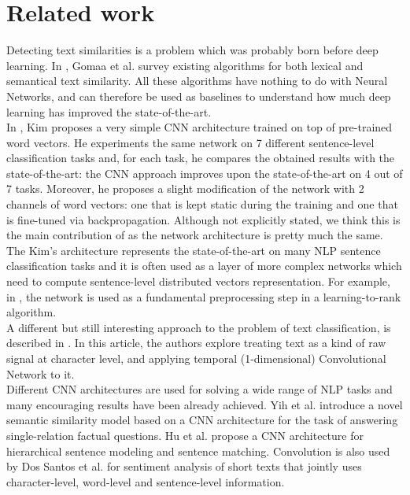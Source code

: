 \documentclass[10pt,twocolumn,letterpaper]{article}
\begin{document}
\section{Related work}
Detecting text similarities is a problem which was probably born before deep learning. In \cite{gomaa2013survey}, Gomaa et al. survey existing algorithms for both lexical and semantical text similarity. All these algorithms have nothing to do with Neural Networks, and can therefore be used as baselines to understand how much deep learning has improved the state-of-the-art.\\
In \cite{kim2014convolutional}, Kim proposes a very simple CNN architecture trained on top of pre-trained word vectors. He experiments the same network on 7 different sentence-level classification tasks and, for each task, he compares the obtained results with the state-of-the-art: the CNN approach improves upon the state-of-the-art on 4 out of 7 tasks. Moreover, he proposes a slight modification of the network with 2 channels of word vectors: one that is kept static during the training and one that is fine-tuned via backpropagation. Although not explicitly stated, we think this is the main contribution of \cite{bogdanova2015detecting} as the network architecture is pretty much the same. The Kim's architecture represents the state-of-the-art on many NLP sentence classification tasks and it is often used as a layer of more complex networks which need to compute sentence-level distributed vectors representation. For example, in \cite{severyn2015learning}, the network is used as a fundamental preprocessing step in a learning-to-rank algorithm. \\
A different but still interesting approach to the problem of text classification, is described in \cite{zhang2015character}. In this article, the authors explore treating text as a kind of raw signal at character level, and applying temporal (1-dimensional) Convolutional Network to it.\\
Different CNN architectures are used for solving a wide range of NLP tasks and many encouraging results have been already achieved. Yih et al. \cite{yih2014semantic} introduce a novel semantic similarity model based on a CNN architecture for the task of answering single-relation factual questions. Hu et al. \cite{hu2014convolutional} propose a CNN architecture for hierarchical sentence modeling and sentence matching. Convolution is also used by Dos Santos et al. \cite{dos2014deep} for sentiment analysis of short texts that jointly uses character-level, word-level and sentence-level information.\\
\end{document}

